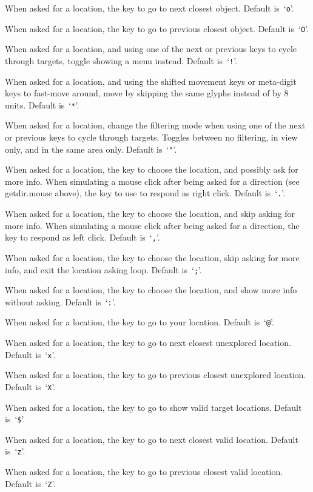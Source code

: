 \documentclass[titlepage]{article}
\begin{document}
\begin{description}[itemindent=10mm, labelwidth=15mm, rightmargin=15mm]
When asked for a location, the key to go to next closest object.
Default is~`\texttt{o}'.
\item[getpos.obj.prev]
When asked for a location, the key to go to previous closest object.
Default is~`\texttt{O}'.
\item[getpos.menu]
When asked for a location, and using one of the next or previous keys to
cycle through targets, toggle showing a menu instead. Default is~`\texttt{!}'.
\item[getpos.moveskip]
When asked for a location, and using the shifted movement keys or
meta-digit keys to fast-move around, move by skipping the same glyphs
instead of by 8 units.
Default is~`\texttt{*}'.
\item[getpos.filter]
When asked for a location, change the filtering mode when using one of
the next or previous keys to cycle through targets. Toggles between no
filtering, in view only, and in the same area only. Default is~`\texttt{"}'.
\item[getpos.pick]
When asked for a location, the key to choose the location, and possibly
ask for more info.
When simulating a mouse click after being asked for a direction (see
getdir.mouse above), the key to use to respond as right click.
Default is~`\texttt{.}'.
\item[getpos.pick.once]
When asked for a location, the key to choose the location, and skip
asking for more info.
When simulating a mouse click after being asked for a direction,
the key to respond as left click.
Default is~`\texttt{,}'.
\item[getpos.pick.quick]
When asked for a location, the key to choose the location, skip asking
for more info, and exit the location asking loop. Default is~`\texttt{;}'.
\item[getpos.pick.verbose]
When asked for a location, the key to choose the location, and show more
info without asking. Default is~`\texttt{:}'.
\item[getpos.self]
When asked for a location, the key to go to your location.
Default is~`\texttt{@}'.
\item[getpos.unexplored.next]
When asked for a location, the key to go to next closest unexplored location.
Default is~`\texttt{x}'.
\item[getpos.unexplored.prev]
When asked for a location, the key to go to previous closest unexplored
location. Default is~`\texttt{X}'.
\item[getpos.valid]
When asked for a location, the key to go to show valid target locations.
Default is~`\texttt{\$}'.
\item[getpos.valid.next]
When asked for a location, the key to go to next closest valid location.
Default is~`\texttt{z}'.
\item[getpos.valid.prev]
When asked for a location, the key to go to previous closest valid location.
Default is~`\texttt{Z}'.
\end{description}
\end{document}
